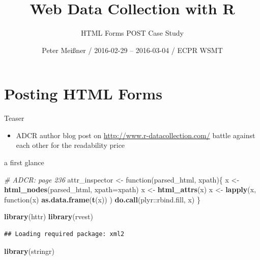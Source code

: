 \documentclass[ignorenonframetext,]{beamer}
\title{Web Data Collection with R}
\subtitle{HTML Forms POST Case Study}
\author{Peter Meißner / 2016-02-29 -- 2016-03-04 / ECPR WSMT}
\date{}
\newenvironment{Shaded}{\begin{snugshade}}{\end{snugshade}}
\newcommand{\KeywordTok}[1]{\textcolor[rgb]{0.13,0.29,0.53}{\textbf{{#1}}}}
\newcommand{\DataTypeTok}[1]{\textcolor[rgb]{0.13,0.29,0.53}{{#1}}}
\newcommand{\StringTok}[1]{\textcolor[rgb]{0.31,0.60,0.02}{{#1}}}
\newcommand{\CommentTok}[1]{\textcolor[rgb]{0.56,0.35,0.01}{\textit{{#1}}}}
\newcommand{\NormalTok}[1]{{#1}}
\providecommand{\tightlist}{%
  \setlength{\itemsep}{0pt}\setlength{\parskip}{0pt}}
\begin{document}
\frame{\titlepage}

\begin{frame}
\tableofcontents[hideallsubsections]
\end{frame}

\section{Posting HTML Forms}\label{posting-html-forms}

\begin{frame}{Teaser}

\begin{itemize}
\tightlist
\item
  ADCR author blog post on \url{http://www.r-datacollection.com/} battle
  against each other for the readability price
\end{itemize}

\end{frame}

\begin{frame}[fragile]{a first glance}

\begin{Shaded}
\begin{Highlighting}[]
\CommentTok{# ADCR: page 236}
\NormalTok{attr_inspector <-}\StringTok{ }\NormalTok{function(parsed_html, xpath)\{}
  \NormalTok{x <-}\StringTok{ }\KeywordTok{html_nodes}\NormalTok{(parsed_html, }\DataTypeTok{xpath=}\NormalTok{xpath)}
  \NormalTok{x <-}\StringTok{ }\KeywordTok{html_attrs}\NormalTok{(x)}
  \NormalTok{x <-}\StringTok{ }\KeywordTok{lapply}\NormalTok{(x, function(x) }\KeywordTok{as.data.frame}\NormalTok{(}\KeywordTok{t}\NormalTok{(x)) )}
  \KeywordTok{do.call}\NormalTok{(plyr::rbind.fill, x)}
\NormalTok{\}}
\end{Highlighting}
\end{Shaded}

\begin{Shaded}
\begin{Highlighting}[]
\KeywordTok{library}\NormalTok{(httr)}
\KeywordTok{library}\NormalTok{(rvest)}
\end{Highlighting}
\end{Shaded}

\begin{verbatim}
## Loading required package: xml2
\end{verbatim}

\begin{Shaded}
\begin{Highlighting}[]
\KeywordTok{library}\NormalTok{(stringr)}
\end{Highlighting}
\end{Shaded}

\end{frame}
\end{document}
